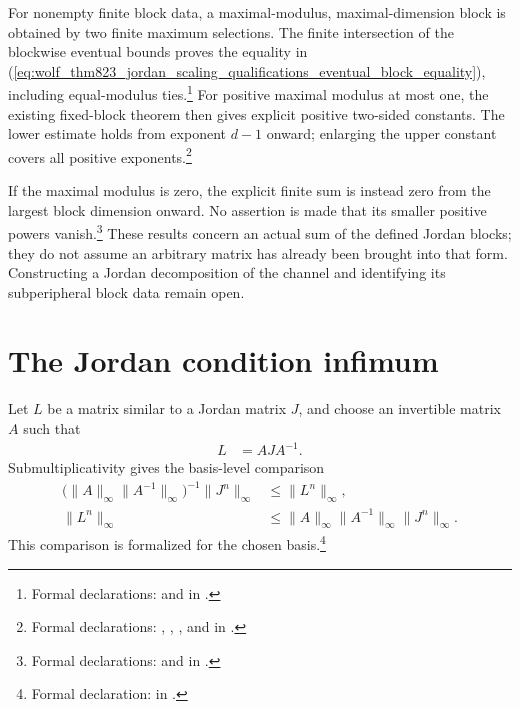 \documentclass{article}
\begin{document}
For nonempty finite block data, a maximal-modulus, maximal-dimension block
is obtained by two finite maximum selections. The finite intersection of
the blockwise eventual bounds proves the equality in
(\ref{eq:wolf_thm823_jordan_scaling_qualifications_eventual_block_equality}),
including equal-modulus ties.\footnote{Formal declarations:
 and
 in
.}
For positive maximal modulus at most one, the existing fixed-block theorem
then gives explicit positive two-sided constants. The lower estimate holds
from exponent $d-1$ onward; enlarging the upper constant covers all positive
exponents.\footnote{Formal declarations:
,
,
, and
 in
.}

If the maximal modulus is zero, the explicit finite sum is instead zero
from the largest block dimension onward. No assertion is made that its
smaller positive powers vanish.\footnote{Formal declarations:
 and
 in
.}
These results concern an actual sum of the defined Jordan blocks; they do
not assume an arbitrary matrix has already been brought into that form.
Constructing a Jordan decomposition of the channel and identifying its
subperipheral block data remain open.

\section{The Jordan condition infimum}

Let $L$ be a matrix similar to a Jordan matrix $J$, and choose an invertible
matrix $A$ such that
\begin{align}
    L
        &= AJA^{-1}.
    \label{eq:wolf_thm823_jordan_scaling_qualifications_similarity}
\end{align}
Submultiplicativity gives the basis-level comparison
\begin{align}
    \bigl(\lVert A\rVert_\infty
          \lVert A^{-1}\rVert_\infty\bigr)^{-1}
    \lVert J^n\rVert_\infty
        &\leq \lVert L^n\rVert_\infty,
    \label{eq:wolf_thm823_jordan_scaling_qualifications_similarity_lower}\\
    \lVert L^n\rVert_\infty
        &\leq
        \lVert A\rVert_\infty
        \lVert A^{-1}\rVert_\infty
        \lVert J^n\rVert_\infty.
    \label{eq:wolf_thm823_jordan_scaling_qualifications_similarity_upper}
\end{align}
This comparison is formalized for the chosen basis.\footnote{Formal
declaration:
 in
.}
\end{document}
